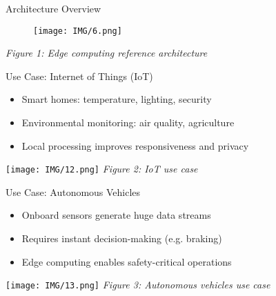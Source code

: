 \documentclass{beamer}
\begin{document}
\begin{frame}{Architecture Overview}
  \centering
  \begin{figure}
    \centering
    \texttt{[image: IMG/6.png]} %
  \end{figure}
  \vspace{0.05cm}
  \small \textit{Figure 1: Edge computing reference architecture}
\end{frame}

\begin{frame}{Use Case: Internet of Things (IoT)}
  \begin{itemize}
    \item Smart homes: temperature, lighting, security
    \item Environmental monitoring: air quality, agriculture
    \item Local processing improves responsiveness and privacy
  \end{itemize}
  \vspace{0.5cm}
  \centering
  \texttt{[image: IMG/12.png]} %
  \vspace{0.2cm}
  \small \textit{Figure 2: IoT use case}
\end{frame}

\begin{frame}{Use Case: Autonomous Vehicles}
  \begin{itemize}
    \item Onboard sensors generate huge data streams
    \item Requires instant decision-making (e.g. braking)
    \item Edge computing enables safety-critical operations
  \end{itemize}
  \vspace{0.2cm}
  \centering
  \texttt{[image: IMG/13.png]} %
  \vspace{0.2cm}
  \small \textit{Figure 3: Autonomous vehicles use case}
\end{frame}
\end{document}
